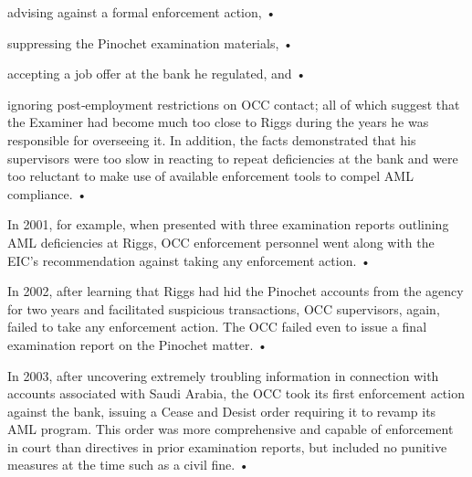 advising against a formal enforcement action,
•

suppressing the Pinochet examination materials,
•

accepting a job offer at the bank he regulated, and
•

ignoring post‐employment restrictions on OCC contact;
all of which suggest that the Examiner had become much too close to Riggs during the years he was
responsible for overseeing it.
In addition, the facts demonstrated that his supervisors were too slow in reacting to repeat
deficiencies at the bank and were too reluctant to make use of available enforcement tools to
compel AML compliance.
•

In 2001, for example, when presented with three examination reports outlining AML
deficiencies at Riggs, OCC enforcement personnel went along with the EIC’s
recommendation against taking any enforcement action.
•

In 2002, after learning that Riggs had hid the Pinochet accounts from the agency for two
years and facilitated suspicious transactions, OCC supervisors, again, failed to take any
enforcement action. The OCC failed even to issue a final examination report on the Pinochet
matter.
•

In 2003, after uncovering extremely troubling information in connection with accounts
associated with Saudi Arabia, the OCC took its first enforcement action against the bank,
issuing a Cease and Desist order requiring it to revamp its AML program. This order was
more comprehensive and capable of enforcement in court than directives in prior
examination reports, but included no punitive measures at the time such as a civil fine.
•

